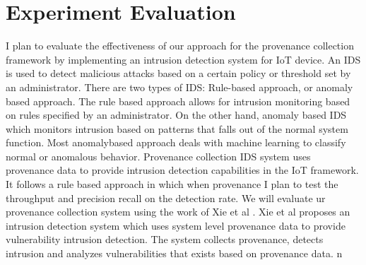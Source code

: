 \section{Experiment Evaluation}

I plan to evaluate the effectiveness of our approach for the provenance collection framework by implementing an intrusion detection system for IoT device. An IDS is used to detect malicious attacks based on a certain policy or threshold set by an administrator. There are two types of  IDS: Rule-based approach, or anomaly based approach. The rule based approach allows for intrusion monitoring based on rules specified by an administrator. On the other hand, anomaly based IDS which monitors intrusion based on patterns that falls out of the normal system function. Most anomaly\-based approach deals with machine learning to classify normal or anomalous behavior. Provenance collection IDS system uses provenance data to provide intrusion detection capabilities in the IoT framework. It follows a rule based approach in which when provenance  I plan to test the throughput and precision recall on the detection rate. We will evaluate ur provenance collection system using the work of Xie et al \cite{Xie:2016:UID:2936026.2936232}. Xie et al proposes an intrusion detection system which uses system level provenance data to provide vulnerability intrusion detection. The system collects provenance, detects intrusion and analyzes vulnerabilities that exists based on provenance data.  n


%
